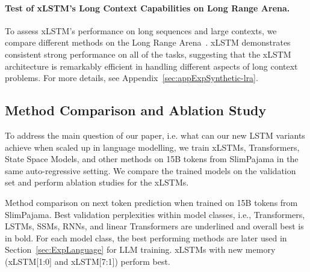 \documentclass[dvipsnames]{article}
\newcommand{\KP}[1]{\textcolor{blue}{Korbinian: #1}}
\newcommand{\MB}[1]{\textcolor{orange}{Max: #1}}
\begin{document}
\paragraph{Test of xLSTM's Long Context Capabilities on Long Range Arena.}
To assess xLSTM's performance on long sequences and large contexts, 
we compare different methods on 
the Long Range Arena~\citep{Tay:21}. 
xLSTM demonstrates consistent strong performance on all of the tasks, 
suggesting that the xLSTM architecture is remarkably 
efficient in handling different aspects of long context problems.
For more details, see Appendix~\ref{sec:appExpSynthetic-lra}.



\subsection{Method Comparison and Ablation Study}
\label{sec:ExpComparison}
To address the main question of our paper, i.e. what can our new LSTM variants achieve when scaled
up in language modelling, we train xLSTMs, Transformers, State Space Models, and other methods
on 15B tokens from SlimPajama in the same auto-regressive setting. We compare the trained models
on the validation set and perform ablation studies for the xLSTMs.


\begin{table}
    \vspace{-0.4cm}
    \centering
    
    \caption{Method comparison on next token prediction when trained on 15B tokens from SlimPajama. Best validation perplexities within model classes, i.e., Transformers, LSTMs,
   SSMs, RNNs, and linear Transformers are underlined
   and overall best is in bold.
   For each model class, the best performing methods are later used in Section~\ref{sec:ExpLanguage} for LLM training.
   \mbox{xLSTMs} with new memory
  (xLSTM[1:0] and \mbox{xLSTM[7:1]}) perform best. \label{tab:spaj15b_model_results}
}
\end{table}
\end{document}
